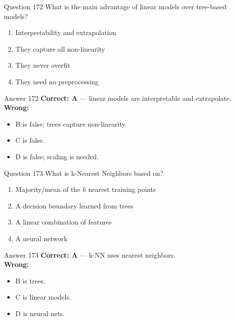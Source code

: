 \documentclass[aspectratio=169,11pt]{beamer}
\begin{document}
	\begin{frame}{Question 172}
		What is the main advantage of linear models over tree-based models?
		\begin{enumerate}[label=\Alph*.]
			\item Interpretability and extrapolation
			\item They capture all non-linearity
			\item They never overfit
			\item They need no preprocessing
		\end{enumerate}
	\end{frame}
	\begin{frame}{Answer 172}
		\textbf{Correct: A} --- linear models are interpretable and extrapolate.\\
		\vspace{0.5em}
		\textbf{Wrong:}
		\begin{itemize}
			\item B is false; trees capture non-linearity.
			\item C is false.
			\item D is false; scaling is needed.
		\end{itemize}
	\end{frame}
	
	\begin{frame}{Question 173}
		What is k-Nearest Neighbors based on?
		\begin{enumerate}[label=\Alph*.]
			\item Majority/mean of the $k$ nearest training points
			\item A decision boundary learned from trees
			\item A linear combination of features
			\item A neural network
		\end{enumerate}
	\end{frame}
	\begin{frame}{Answer 173}
		\textbf{Correct: A} --- k-NN uses nearest neighbors.\\
		\vspace{0.5em}
		\textbf{Wrong:}
		\begin{itemize}
			\item B is trees.
			\item C is linear models.
			\item D is neural nets.
		\end{itemize}
	\end{frame}
	
\end{document}
